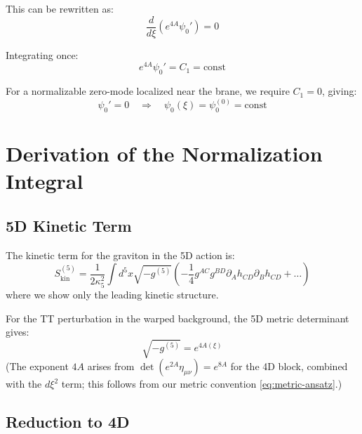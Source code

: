 \documentclass[11pt,a4paper]{article}
\newcommand{\kfive}{\kappa_5}
\begin{document}
This can be rewritten as:
\begin{equation}
\frac{d}{d\xi}\left( e^{4A} \psi_0' \right) = 0
\label{eq:zero-mode-conserved}
\end{equation}

Integrating once:
\begin{equation}
e^{4A} \psi_0' = C_1 = \mathrm{const}
\label{eq:zero-mode-int1}
\end{equation}

For a normalizable zero-mode localized near the brane, we require $C_1 = 0$,
giving:
\begin{equation}
\psi_0' = 0 \quad \Rightarrow \quad \psi_0(\xi) = \psi_0^{(0)} = \mathrm{const}
\label{eq:zero-mode-const}
\end{equation}

\section{Derivation of the Normalization Integral}

\subsection{5D Kinetic Term}

The kinetic term for the graviton in the 5D action is:
\begin{equation}
S_{\mathrm{kin}}^{(5)} = \frac{1}{2\kfive^2} \int d^5x \sqrt{-g^{(5)}}
\left( -\frac{1}{4} g^{AC} g^{BD} \partial_A h_{CD} \partial_B h_{CD} + \ldots \right)
\label{eq:5D-kinetic}
\end{equation}
where we show only the leading kinetic structure.

For the TT perturbation in the warped background, the 5D metric determinant gives:
\begin{equation}
\sqrt{-g^{(5)}} = e^{4A(\xi)}
\label{eq:sqrt-g5}
\end{equation}
(The exponent $4A$ arises from $\det(e^{2A}\eta_{\mu\nu}) = e^{8A}$ for the 4D block,
combined with the $d\xi^2$ term; this follows from our metric convention \eqref{eq:metric-ansatz}.)

\subsection{Reduction to 4D}
\end{document}
